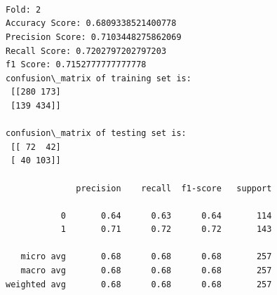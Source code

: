 \documentclass[11pt]{article}
\begin{document}
    \begin{center}
    \end{center}
    { \hspace*{\fill} \\}
    
    \begin{center}
    \end{center}
    { \hspace*{\fill} \\}
    
    \begin{Verbatim}[commandchars=\\\{\}]

Fold: 2
Accuracy Score: 0.6809338521400778
Precision Score: 0.7103448275862069
Recall Score: 0.7202797202797203
f1 Score: 0.7152777777777778
confusion\_matrix of training set is: 
 [[280 173]
 [139 434]] 

confusion\_matrix of testing set is: 
 [[ 72  42]
 [ 40 103]] 

              precision    recall  f1-score   support

           0       0.64      0.63      0.64       114
           1       0.71      0.72      0.72       143

   micro avg       0.68      0.68      0.68       257
   macro avg       0.68      0.68      0.68       257
weighted avg       0.68      0.68      0.68       257


    \end{Verbatim}

    \begin{center}
    \end{center}
    { \hspace*{\fill} \\}
    
    \begin{center}
    \end{center}
    { \hspace*{\fill} \\}
    
\end{document}
